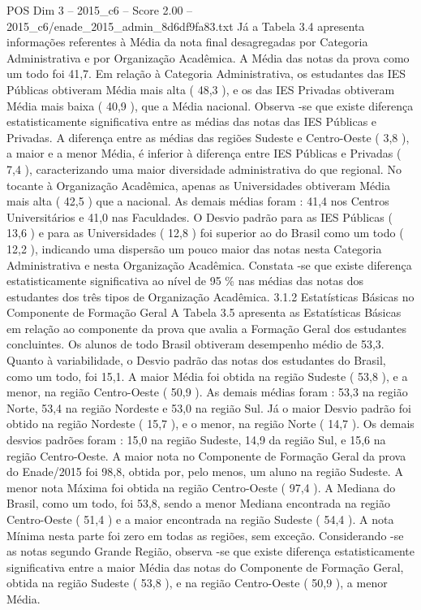 \begin{textsample}{POS Dim 3 – 2015\_c6 – Score 2.00 – 2015\_c6/enade\_2015\_admin\_8d6df9fa83.txt}
Já a Tabela 3.4 apresenta informações referentes à Média da nota final desagregadas por Categoria Administrativa e por Organização Acadêmica.
A Média das notas da prova como um todo foi 41,7.
Em relação à Categoria Administrativa, os estudantes das IES Públicas obtiveram Média mais alta ( 48,3 ), e os das IES Privadas obtiveram Média mais baixa ( 40,9 ), que a Média nacional.
Observa -se que existe diferença estatisticamente significativa entre as médias das notas das IES Públicas e Privadas.
A diferença entre as médias das regiões Sudeste e Centro-Oeste ( 3,8 ), a maior e a menor Média, é inferior à diferença entre IES Públicas e Privadas ( 7,4 ), caracterizando uma maior diversidade administrativa do que regional.
No tocante à Organização Acadêmica, apenas as Universidades obtiveram Média mais alta ( 42,5 ) que a nacional.
As demais médias foram : 41,4 nos Centros Universitários e 41,0 nas Faculdades.
O Desvio padrão para as IES Públicas ( 13,6 ) e para as Universidades ( 12,8 ) foi superior ao do Brasil como um todo ( 12,2 ), indicando uma dispersão um pouco maior das notas nesta Categoria Administrativa e nesta Organização Acadêmica.
Constata -se que existe diferença estatisticamente significativa ao nível de 95 \% nas médias das notas dos estudantes dos três tipos de Organização Acadêmica. 3.1.2 Estatísticas Básicas no Componente de Formação Geral A Tabela 3.5 apresenta as Estatísticas Básicas em relação ao componente da prova que avalia a Formação Geral dos estudantes concluintes.
Os alunos de todo Brasil obtiveram desempenho médio de 53,3.
Quanto à variabilidade, o Desvio padrão das notas dos estudantes do Brasil, como um todo, foi 15,1.
A maior Média foi obtida na região Sudeste ( 53,8 ), e a menor, na região Centro-Oeste ( 50,9 ).
As demais médias foram : 53,3 na região Norte, 53,4 na região Nordeste e 53,0 na região Sul.
Já o maior Desvio padrão foi obtido na região Nordeste ( 15,7 ), e o menor, na região Norte ( 14,7 ).
Os demais desvios padrões foram : 15,0 na região Sudeste, 14,9 da região Sul, e 15,6 na região Centro-Oeste.
A maior nota no Componente de Formação Geral da prova do Enade/2015 foi 98,8, obtida por, pelo menos, um aluno na região Sudeste.
A menor nota Máxima foi obtida na região Centro-Oeste ( 97,4 ).
A Mediana do Brasil, como um todo, foi 53,8, sendo a menor Mediana encontrada na região Centro-Oeste ( 51,4 ) e a maior encontrada na região Sudeste ( 54,4 ).
A nota Mínima nesta parte foi zero em todas as regiões, sem exceção.
Considerando -se as notas segundo Grande Região, observa -se que existe diferença estatisticamente significativa entre a maior Média das notas do Componente de Formação Geral, obtida na região Sudeste ( 53,8 ), e na região Centro-Oeste ( 50,9 ), a menor Média.

\end{textsample}
